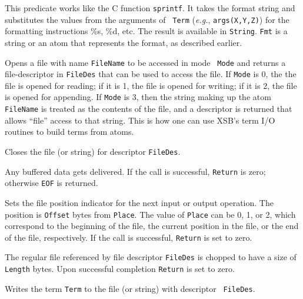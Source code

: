\begin{description}
    This predicate works like the C function {\tt sprintf}. It takes the
    format string and substitutes the values from the arguments of {\tt
      Term} ({\it e.g.}, {\tt args(X,Y,Z)}) for the formatting instructions
    \%s, \%d, etc. The result is available in {\tt String}. {\tt Fmt} is a
    string or an atom that represents the format, as described earlier.

    Opens a file with name {\tt FileName} to be accessed in mode {\tt
    Mode} and returns a file-descriptor in {\tt FileDes} that can be
    used to access the file.  If {\tt Mode} is 0, the the file is
    opened for reading; if it is 1, the file is opened for writing; if
    it is 2, the file is opened for appending.  If {\tt Mode} is 3,
    then the string making up the atom {\tt FileName} is treated as
    the contents of the file, and a descriptor is returned that allows
    ``file'' access to that string.  This is how one can use
    XSB's term I/O routines to build terms from atoms.

    Closes the file (or string) for descriptor {\tt FileDes}.

    Any buffered data gets delivered. If the call is successful, {\tt Return}
    is zero; otherwise {\tt EOF} is returned.

    Sets the file position indicator for the next input or output
    operation. The position is {\tt Offset} bytes from {\tt Place}.
    The value of {\tt Place} can be 0, 1, or 2, which correspond to
    the beginning of the file, the current position in the file, or
    the end of the file, respectively. If the call is successful,
    {\tt Return} is set to zero.

    The regular file  referenced by file descriptor {\tt FileDes}
    is chopped to have a size of {\tt Length} bytes. Upon successful
    completion {\tt Return} is set to zero.

    Writes the term {\tt Term} to the file (or string) with descriptor {\tt
    FileDes}.


\end{description}
